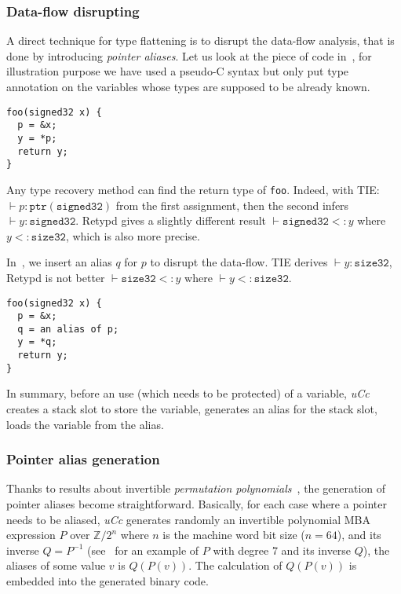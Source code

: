 \documentclass[compsoc,conference,a4paper,10pt,times]{IEEEtran}
\begin{document}
\subsubsection*{Data-flow disrupting}
A direct technique for type flattening is to disrupt the data-flow analysis, that is done by
introducing \emph{pointer aliases}. Let us look at the
piece of code in~, for illustration purpose we have used a pseudo-C syntax but only
put type annotation on the variables whose types are supposed to be already known.
\begin{lstlisting}[style={c},caption={Direct data movement},label={lst:directmov}]
foo(signed32 x) {
  p = &x;
  y = *p;
  return y;
}
\end{lstlisting}
Any type recovery method can find the return type of \texttt{foo}. Indeed,
with TIE: $\vdash p \colon \mathtt{ptr}(\mathtt{signed32})$ from the first assignment,
then the second infers $\vdash y \colon \mathtt{signed32}$. Retypd gives a slightly
different result $\vdash \mathtt{signed32} <\colon y$
where $y <\colon \mathtt{size32}$, which is also more precise.

In~, we insert an alias $q$ for $p$ to disrupt the data-flow.
TIE derives $\vdash y \colon \mathtt{size32}$, Retypd is not better
$\vdash \mathtt{size32} <\colon y$ where $\vdash y <\colon \mathtt{size32}$.
\begin{lstlisting}[style={c},caption={Data movement with pointer alias},label={lst:obfmov}]
foo(signed32 x) {
  p = &x;
  q = an alias of p;
  y = *q;
  return y;
}
\end{lstlisting}
In summary, before an use (which needs to be protected) of a
variable, \emph{uCc} \raisebox{.5pt}{\textcircled{\raisebox{-.9pt} {1}}} creates a stack slot to store the variable,
\raisebox{.5pt}{\textcircled{\raisebox{-.9pt} {2}}} generates an alias for the stack slot,
\raisebox{.5pt}{\textcircled{\raisebox{-.9pt} {3}}} loads the variable from the alias.

\subsubsection*{Pointer alias generation}
Thanks to results about invertible \emph{permutation polynomials}~\cite{zhou_information_2007}, the
generation of pointer aliases become straightforward. Basically, for each case where a pointer needs to
be aliased, \emph{uCc} generates randomly an invertible polynomial MBA expression $P$ over
$\mathbb{Z}/2^n$ where $n$ is the machine word bit size ($n = 64$), and its inverse $Q = P^{-1}$
(see~ for an example of $P$ with degree 7 and its inverse $Q$),
the aliases of some value $v$ is $Q(P(v))$. The calculation of $Q(P(v))$ is embedded into the generated
binary code.
\end{document}

